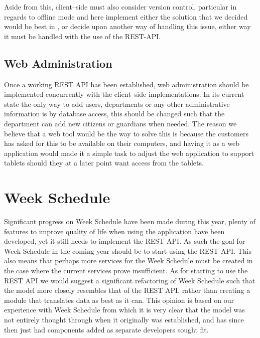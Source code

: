 Aside from this, client--side must also consider version control, particular in regards to offline mode and here implement either the solution that we decided would be best in , or decide upon another way of handling this issue, either way it must be handled with the use of the REST-API.

\subsection{Web Administration}
Once a working REST API has been established, web administration should be implemented concurrently with the client--side implementations.
In its current state the only way to add users, departments or any other administrative information is by database access, this should be changed such that the department can add new citizens or guardians when needed.
The reason we believe that a web tool would be the way to solve this is because the customers has asked for this to be available on their computers, and having it as a web application would made it a simple task to adjust the web application to support tablets should they at a later point want access from the tablets.

\section{Week Schedule}
Significant progress on Week Schedule have been made during this year, plenty of features to improve quality of life when using the application have been developed, yet it still needs to implement the REST API.
As such the goal for Week Schedule in the coming year should be to start using the REST API.
This also means that perhaps more services for the Week Schedule must be created in the case where the current services prove insufficient.
As for starting to use the REST API we would suggest a significant refactoring of Week Schedule such that the model more closely resembles that of the REST API, rather than creating a module that translates data as best as it can.
This opinion is based on our experience with Week Schedule from which it is very clear that the model was not entirely thought through when it originally was established, and has since then just had components added as separate developers sought fit.

